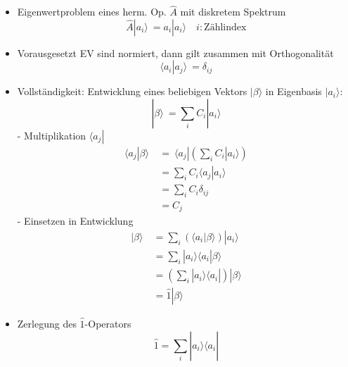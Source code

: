 \documentclass[10pt,article,colorback,accentcolor=tud9d]{scrartcl}
\begin{document}
\begin{itemize}
  \item Eigenwertproblem eines herm. Op. $\hat{A}$ mit diskretem Spektrum
    \begin{equation}
    \hat{A}\left.\right|a_i\rangle  \ = a_i\left.\right|a_i\rangle  \quad i:\text{Zählindex}
    \end{equation}
  \item Vorausgesetzt EV sind normiert, dann gilt zusammen mit Orthogonalität 
    \begin{equation}
    \langle a_i\left.\right|a_j\rangle  \ = \delta_{ij}
    \end{equation}
  \item Vollständigkeit: Entwicklung eines beliebigen Vektors $\left.\right|\beta\rangle $ in Eigenbasis $\left.\right|a_i\rangle $:
    \begin{equation}
    \left.\right|\beta\rangle  \ = \sum_i C_i \left.\right|a_i \rangle 
    \end{equation}
    - Multiplikation $\langle a_j\left.\right|$
      \begin{equation}
      \begin{aligned}
      \langle a_j\left.\right|\beta\rangle  \ &= \ \langle a_j\left.\right|\left(\sum_i C_i\left.\right|a_i\rangle \right)\\
      &=\sum_iC_i\langle a_j\left.\right|a_i\rangle \\
      &=\sum_iC_i \delta_{ij}\\
      &=C_j
      \end{aligned}
      \end{equation}
    - Einsetzen in Entwicklung
    \begin{equation}
    \begin{aligned}
      \left.\right|\beta\rangle  \ &= \sum_i\left(\langle a_i\left.\right|\beta\rangle \right) \left.\right|a_i\rangle \\
      &=\sum_i\left.\right|a_i\rangle \langle a_i\left.\right|\beta\rangle \\
      &=\left(\sum_i\left.\right|a_i\rangle \langle a_i\left.\right|\right)\left.\right|\beta\rangle \\
      &=\hat{1}\left.\right|\beta\rangle 
    \end{aligned}
    \end{equation}
  \item Zerlegung des $\hat{1}$-Operators
    \begin{equation}
    \hat{1}= \sum_i \left.\right|a_i\rangle \langle a_i\left.\right|

\end{equation}
\end{itemize}
\end{document}
